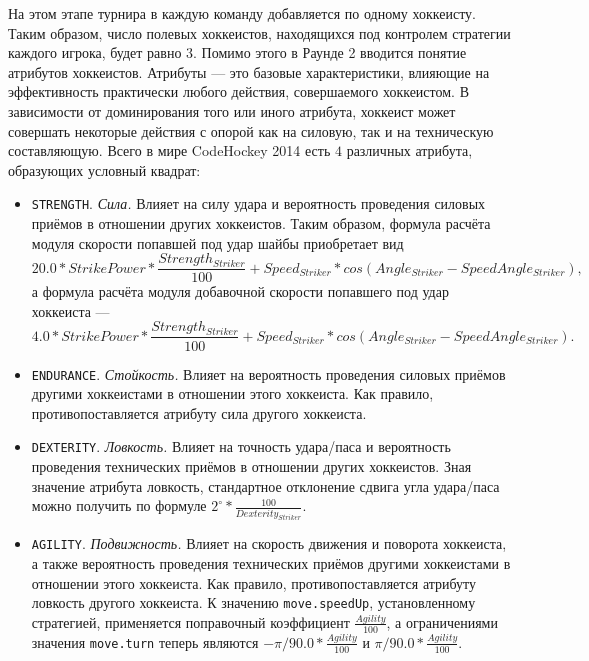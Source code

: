 На этом этапе турнира в каждую команду добавляется по одному хоккеисту. Таким образом, число полевых хоккеистов, находящихся под контролем
стратегии каждого игрока, будет равно $3$. Помимо этого в Раунде 2 вводится понятие атрибутов хоккеистов. Атрибуты --- это базовые
характеристики, влияющие на эффективность практически любого действия, совершаемого хоккеистом. В зависимости от доминирования того или
иного атрибута, хоккеист может совершать некоторые действия с опорой как на силовую, так и на техническую составляющую. Всего в мире
CodeHockey 2014 есть $4$ различных атрибута, образующих условный квадрат:
\begin{itemize}
  \item \texttt{STRENGTH}. \textit{Сила.} Влияет на силу удара и вероятность проведения силовых приёмов в отношении других хоккеистов.
        Таким образом, формула расчёта модуля скорости попавшей под удар шайбы приобретает вид
        \begin{equation}
        20.0*StrikePower*\frac{Strength_{Striker}}{100}+Speed_{Striker}*cos(Angle_{Striker}-SpeedAngle_{Striker}),
        \end{equation}
        а формула расчёта модуля добавочной скорости попавшего под удар хоккеиста ---
        \begin{equation}
        4.0*StrikePower*\frac{Strength_{Striker}}{100}+Speed_{Striker}*cos(Angle_{Striker}-SpeedAngle_{Striker}).
        \end{equation}
  \item \texttt{ENDURANCE}. \textit{Стойкость.} Влияет на вероятность проведения силовых приёмов другими хоккеистами в отношении этого
        хоккеиста. Как правило, противопоставляется атрибуту сила другого хоккеиста.
  \item \texttt{DEXTERITY}. \textit{Ловкость.} Влияет на точность удара/паса и вероятность проведения технических приёмов в отношении других
        хоккеистов. Зная значение атрибута ловкость, стандартное отклонение сдвига угла удара/паса можно получить по формуле
        $2^\circ*\frac{100}{Dexterity_{Striker}}$.
  \item \texttt{AGILITY}. \textit{Подвижность.} Влияет на скорость движения и поворота хоккеиста, а также вероятность проведения технических
        приёмов другими хоккеистами в отношении этого хоккеиста. Как правило, противопоставляется атрибуту ловкость другого хоккеиста.
        К значению \texttt{move.speedUp}, установленному стратегией, применяется поправочный коэффициент $\frac{Agility}{100}$, а
        ограничениями значения \texttt{move.turn} теперь являются $-\pi/90.0*\frac{Agility}{100}$ и $\pi/90.0*\frac{Agility}{100}$.
\end{itemize}

